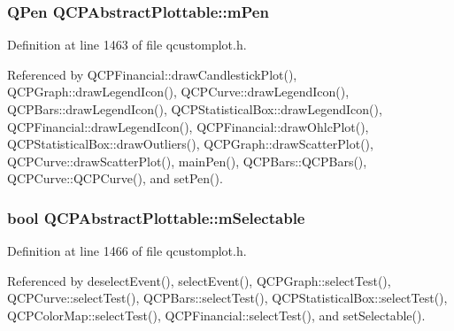 \hypertarget{class_q_c_p_abstract_plottable_a67bc0622fd1b9fa14e54c14922dcec66}{}
\subsubsection[{m\+Pen}]{\setlength{\rightskip}{0pt plus 5cm}Q\+Pen Q\+C\+P\+Abstract\+Plottable\+::m\+Pen\hspace{0.3cm}{\ttfamily [protected]}}\label{class_q_c_p_abstract_plottable_a67bc0622fd1b9fa14e54c14922dcec66}


Definition at line 1463 of file qcustomplot.\+h.



Referenced by Q\+C\+P\+Financial\+::draw\+Candlestick\+Plot(), Q\+C\+P\+Graph\+::draw\+Legend\+Icon(), Q\+C\+P\+Curve\+::draw\+Legend\+Icon(), Q\+C\+P\+Bars\+::draw\+Legend\+Icon(), Q\+C\+P\+Statistical\+Box\+::draw\+Legend\+Icon(), Q\+C\+P\+Financial\+::draw\+Legend\+Icon(), Q\+C\+P\+Financial\+::draw\+Ohlc\+Plot(), Q\+C\+P\+Statistical\+Box\+::draw\+Outliers(), Q\+C\+P\+Graph\+::draw\+Scatter\+Plot(), Q\+C\+P\+Curve\+::draw\+Scatter\+Plot(), main\+Pen(), Q\+C\+P\+Bars\+::\+Q\+C\+P\+Bars(), Q\+C\+P\+Curve\+::\+Q\+C\+P\+Curve(), and set\+Pen().

\hypertarget{class_q_c_p_abstract_plottable_aceee52342c8e75727abcbd164986fdcb}{}
\subsubsection[{m\+Selectable}]{\setlength{\rightskip}{0pt plus 5cm}bool Q\+C\+P\+Abstract\+Plottable\+::m\+Selectable\hspace{0.3cm}{\ttfamily [protected]}}\label{class_q_c_p_abstract_plottable_aceee52342c8e75727abcbd164986fdcb}


Definition at line 1466 of file qcustomplot.\+h.



Referenced by deselect\+Event(), select\+Event(), Q\+C\+P\+Graph\+::select\+Test(), Q\+C\+P\+Curve\+::select\+Test(), Q\+C\+P\+Bars\+::select\+Test(), Q\+C\+P\+Statistical\+Box\+::select\+Test(), Q\+C\+P\+Color\+Map\+::select\+Test(), Q\+C\+P\+Financial\+::select\+Test(), and set\+Selectable().

